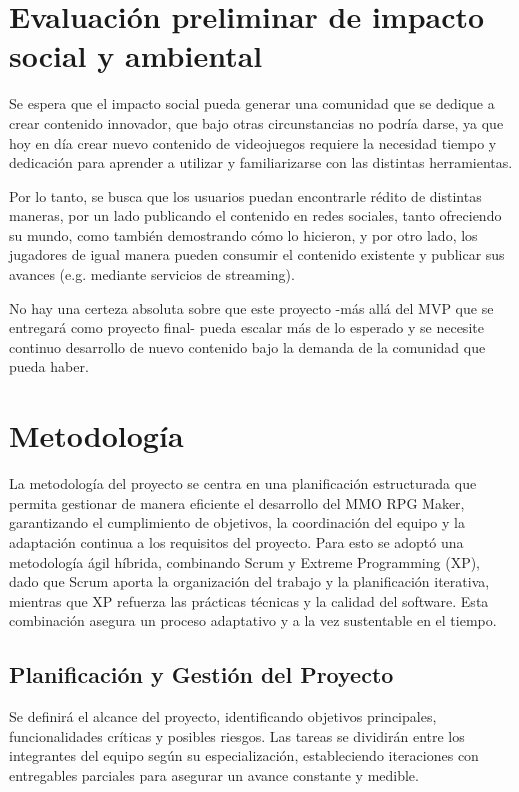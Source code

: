 \section{Evaluación preliminar de impacto social y ambiental}

Se espera que el impacto social pueda generar una comunidad que se dedique a crear contenido innovador, que bajo otras circunstancias no podría darse,
ya que hoy en día crear nuevo contenido de videojuegos requiere la necesidad tiempo y dedicación para aprender a utilizar y familiarizarse con las distintas herramientas.
\vspace{0.25cm}

Por lo tanto, se busca que los usuarios puedan encontrarle rédito de distintas maneras, por un lado publicando el contenido en redes sociales, 
tanto ofreciendo su mundo, como también demostrando cómo lo hicieron, y por otro lado,
los jugadores de igual manera pueden consumir el contenido existente y publicar sus avances (e.g. mediante servicios de streaming).
\vspace{0.25cm}

No hay una certeza absoluta sobre que este proyecto -más allá del MVP que se entregará como proyecto final- 
pueda escalar más de lo esperado y se necesite continuo desarrollo de nuevo contenido bajo la demanda de la comunidad que pueda haber.

\section{Metodología}

La metodología del proyecto se centra en una planificación estructurada que permita gestionar de manera eficiente el desarrollo del MMO RPG Maker, 
garantizando el cumplimiento de objetivos, la coordinación del equipo y la adaptación continua a los requisitos del proyecto. Para esto se adoptó una metodología ágil híbrida,
combinando Scrum y Extreme Programming (XP), dado que Scrum aporta la organización del trabajo y la planificación iterativa, mientras que XP refuerza las prácticas técnicas y la 
calidad del software. Esta combinación asegura un proceso adaptativo y a la vez sustentable en el tiempo.

\subsection{Planificación y Gestión del Proyecto}
Se definirá el alcance del proyecto, identificando objetivos principales, funcionalidades críticas y posibles riesgos. 
Las tareas se dividirán entre los integrantes del equipo según su especialización, estableciendo iteraciones con entregables parciales 
para asegurar un avance constante y medible.

